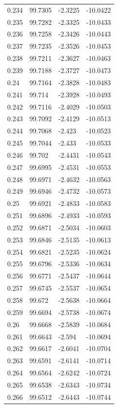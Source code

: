 \begin{tabular}{llll}
0.234 & 99.7305 & -2.3225 & -10.0422 \\
0.235 & 99.7282 & -2.3325 & -10.0433 \\
0.236 & 99.7258 & -2.3426 & -10.0443 \\
0.237 & 99.7235 & -2.3526 & -10.0453 \\
0.238 & 99.7211 & -2.3627 & -10.0463 \\
0.239 & 99.7188 & -2.3727 & -10.0473 \\
0.24 & 99.7164 & -2.3828 & -10.0483 \\
0.241 & 99.714 & -2.3928 & -10.0493 \\
0.242 & 99.7116 & -2.4029 & -10.0503 \\
0.243 & 99.7092 & -2.4129 & -10.0513 \\
0.244 & 99.7068 & -2.423 & -10.0523 \\
0.245 & 99.7044 & -2.433 & -10.0533 \\
0.246 & 99.702 & -2.4431 & -10.0543 \\
0.247 & 99.6995 & -2.4531 & -10.0553 \\
0.248 & 99.6971 & -2.4632 & -10.0563 \\
0.249 & 99.6946 & -2.4732 & -10.0573 \\
0.25 & 99.6921 & -2.4833 & -10.0583 \\
0.251 & 99.6896 & -2.4933 & -10.0593 \\
0.252 & 99.6871 & -2.5034 & -10.0603 \\
0.253 & 99.6846 & -2.5135 & -10.0613 \\
0.254 & 99.6821 & -2.5235 & -10.0624 \\
0.255 & 99.6796 & -2.5336 & -10.0634 \\
0.256 & 99.6771 & -2.5437 & -10.0644 \\
0.257 & 99.6745 & -2.5537 & -10.0654 \\
0.258 & 99.672 & -2.5638 & -10.0664 \\
0.259 & 99.6694 & -2.5738 & -10.0674 \\
0.26 & 99.6668 & -2.5839 & -10.0684 \\
0.261 & 99.6643 & -2.594 & -10.0694 \\
0.262 & 99.6617 & -2.6041 & -10.0704 \\
0.263 & 99.6591 & -2.6141 & -10.0714 \\
0.264 & 99.6564 & -2.6242 & -10.0724 \\
0.265 & 99.6538 & -2.6343 & -10.0734 \\
0.266 & 99.6512 & -2.6443 & -10.0744 \\

\end{tabular}
